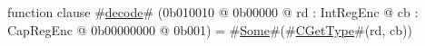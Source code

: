 function clause #\hyperref[sailMIPSzdecode]{decode}# (0b010010 @ 0b00000 @ rd : IntRegEnc @ cb : CapRegEnc @ 0b00000000 @ 0b001) = #\hyperref[sailMIPSzSome]{Some}#(#\hyperref[sailMIPSzCGetType]{CGetType}#(rd, cb))
